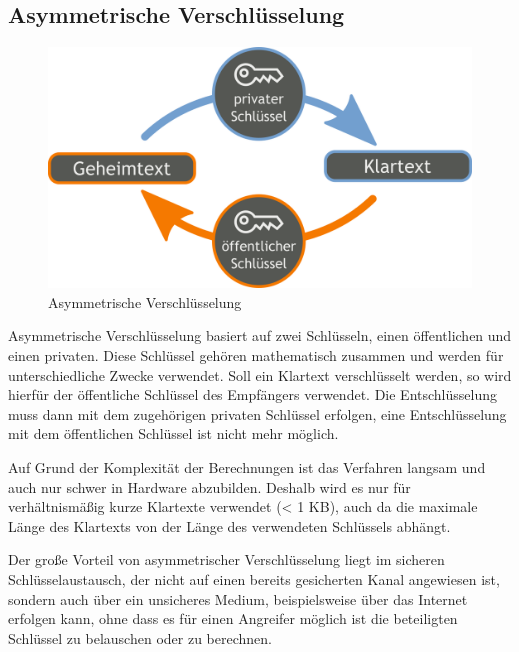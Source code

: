 \subsection{Asymmetrische Verschlüsselung}
\label{sec:asym_verschl}

\begin{figure}[h!]
	\centering
	\includegraphics[width=\linewidth]{img/AsymKrypto.png}
	\caption{Asymmetrische Verschlüsselung}
	\label{fig:asym_verschl}
	\end{figure}


Asymmetrische Verschlüsselung basiert auf zwei Schlüsseln, einen öffentlichen und einen privaten. Diese Schlüssel gehören mathematisch zusammen und werden für unterschiedliche Zwecke verwendet.
Soll ein Klartext verschlüsselt werden, so wird hierfür der öffentliche Schlüssel des Empfängers verwendet. Die Entschlüsselung muss dann mit dem zugehörigen privaten Schlüssel erfolgen, eine Entschlüsselung mit dem öffentlichen Schlüssel ist nicht mehr möglich.

Auf Grund der Komplexität der Berechnungen ist das Verfahren langsam und auch nur schwer in Hardware abzubilden. Deshalb wird es nur für verhältnismäßig kurze Klartexte verwendet (< 1 KB), auch da die maximale Länge des Klartexts von der Länge des verwendeten Schlüssels abhängt. %


Der große Vorteil von asymmetrischer Verschlüsselung liegt im sicheren Schlüsselaustausch, der nicht auf einen bereits gesicherten Kanal angewiesen ist, sondern auch über ein unsicheres Medium, beispielsweise über das Internet erfolgen kann, ohne dass es für einen Angreifer möglich ist die beteiligten Schlüssel zu belauschen oder zu berechnen. %




